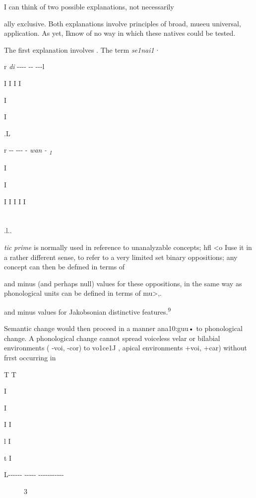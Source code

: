 I can think of two possible explanations, not necessarily

ally exclusive. Both explanations involve principles of broad, mueeu universal, application. As yet, Iknow of no way in which these natives could be tested.

The first explanation involves . The term \textit{se1nai1·}

r \textit{di} {}-{}-{}-{}- {}-{}- {}-{}-{}-l

I I I I

I

I

.L

r {}-{}- {}-{}-{}- {}- \textit{wan} \textit{{}-} \textit{\textsubscript{1}}

I 

I

I I I I I

\section{}
.l..

\textit{tic} \textit{prime} is normally used in reference to unanalyzable concepts; hfl {\textless}o Iuse it in a rather different sense, to refer to a very limited set binary oppositions; any concept can then be defmed in terms of

and minus (and perhaps null) values for these oppositions, in
the same way as phonological units can be defined in terms of mu{\textgreater},.

and minus values for Jakobsonian distinctive features.\textsuperscript{9}

Semantic change would then proceed in a manner ana10:guu• to phonological change. A phonological change cannot spread voiceless velar or bilabial environments ( {}-voi, {}-cor) to vo1ce1J , apical environments +voi, +car) without frrst occurring in


T T

I

I

I I

l I

t I

L-{}-{}-{}-{}-{}- {}-{}-{}-{}-{}- {}-{}-{}-{}-{}-{}-{}-{}-{}-{}-{}-

\begin{figure}
\caption{3}
\label{fig:4}
\end{figure}

